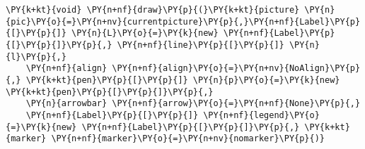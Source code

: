 \begin{Verbatim}[commandchars=\\\{\}]
    \PY{k+kt}{void} \PY{n+nf}{draw}\PY{p}{(}\PY{k+kt}{picture} \PY{n}{pic}\PY{o}{=}\PY{n+nv}{currentpicture}\PY{p}{,}\PY{n+nf}{Label}\PY{p}{[}\PY{p}{]} \PY{n}{L}\PY{o}{=}\PY{k}{new} \PY{n+nf}{Label}\PY{p}{[}\PY{p}{]}\PY{p}{,} \PY{n+nf}{line}\PY{p}{[}\PY{p}{]} \PY{n}{l}\PY{p}{,}
    \PY{n+nf}{align} \PY{n+nf}{align}\PY{o}{=}\PY{n+nv}{NoAlign}\PY{p}{,} \PY{k+kt}{pen}\PY{p}{[}\PY{p}{]} \PY{n}{p}\PY{o}{=}\PY{k}{new} \PY{k+kt}{pen}\PY{p}{[}\PY{p}{]}\PY{p}{,}
    \PY{n}{arrowbar} \PY{n+nf}{arrow}\PY{o}{=}\PY{n+nf}{None}\PY{p}{,}
    \PY{n+nf}{Label}\PY{p}{[}\PY{p}{]} \PY{n+nf}{legend}\PY{o}{=}\PY{k}{new} \PY{n+nf}{Label}\PY{p}{[}\PY{p}{]}\PY{p}{,} \PY{k+kt}{marker} \PY{n+nf}{marker}\PY{o}{=}\PY{n+nv}{nomarker}\PY{p}{)}
\end{Verbatim}
